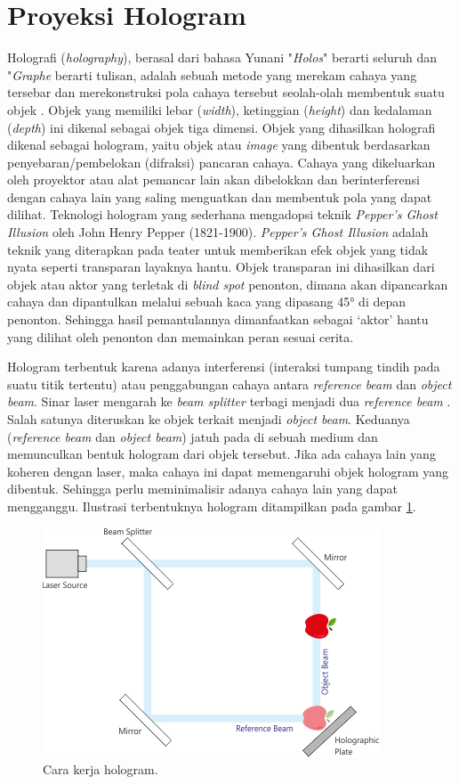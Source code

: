 \section{Proyeksi Hologram}
\vspace{1ex}
	Holografi (\textit{holography}), berasal dari bahasa Yunani "\textit{Holos}" berarti seluruh dan "\textit{Graphe} berarti tulisan, adalah sebuah metode yang merekam cahaya yang tersebar dan merekonstruksi pola cahaya tersebut seolah-olah membentuk suatu objek \cite{akshay_2015}. Objek yang memiliki lebar (\textit{width}), ketinggian (\textit{height}) dan kedalaman (\textit{depth}) ini dikenal sebagai objek tiga dimensi. Objek yang dihasilkan holografi dikenal sebagai hologram, yaitu objek atau \textit{image} yang dibentuk berdasarkan penyebaran/pembelokan (difraksi) pancaran cahaya. Cahaya yang dikeluarkan oleh proyektor atau alat pemancar lain akan dibelokkan dan berinterferensi dengan cahaya lain yang saling menguatkan dan membentuk pola yang dapat dilihat. Teknologi hologram yang sederhana mengadopsi teknik \textit{Pepper’s Ghost Illusion} oleh John Henry Pepper (1821-1900). \textit{Pepper’s Ghost Illusion} adalah teknik yang diterapkan pada teater untuk memberikan efek objek yang tidak nyata seperti transparan layaknya hantu. Objek transparan ini dihasilkan dari objek atau aktor yang terletak di \textit{blind spot} penonton, dimana akan dipancarkan cahaya dan dipantulkan melalui sebuah kaca yang dipasang 45° di depan penonton. Sehingga hasil pemantulannya dimanfaatkan sebagai ‘aktor’ hantu yang dilihat oleh penonton dan memainkan peran sesuai cerita\cite{vishnu2017hologram}.
	
	Hologram terbentuk karena adanya interferensi (interaksi tumpang tindih pada suatu titik tertentu) atau penggabungan cahaya antara \textit{reference beam} dan \textit{object beam}. Sinar laser mengarah ke \textit{beam splitter} terbagi menjadi dua \textit{reference beam} \cite{akshay_2015}. Salah satunya diteruskan ke objek terkait menjadi \textit{object beam}. Keduanya (\textit{reference beam} dan \textit{object beam}) jatuh pada di sebuah medium dan memunculkan bentuk hologram dari objek tersebut. Jika ada cahaya lain yang koheren dengan laser, maka cahaya ini dapat memengaruhi objek hologram yang dibentuk. Sehingga perlu meminimalisir adanya cahaya lain yang dapat mengganggu. Ilustrasi terbentuknya hologram ditampilkan pada gambar \ref{fig:hologram_kerja}.
	\begin{figure} [H]
		\includegraphics[scale=0.4]{img/bab2/hologram_kerja.png}
		\caption{Cara kerja hologram.}
		\label{fig:hologram_kerja}
	\end{figure}
	

